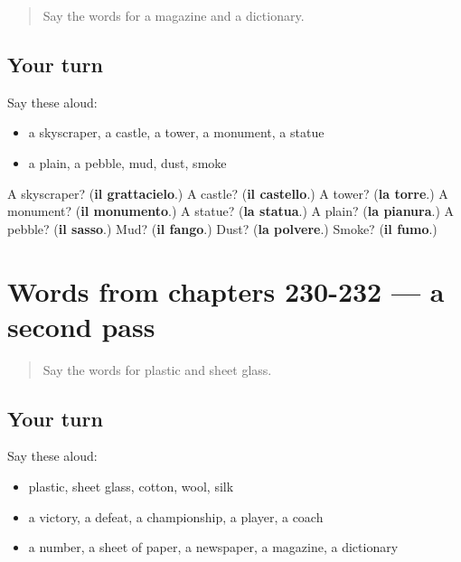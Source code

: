 \label{lesson:IT-R232-first-pass-words-from-chapters-228-229}



\begin{quote}
Say the words for a magazine and a dictionary.
\end{quote}

\subsection*{Your turn}
Say these aloud:

\begin{itemize}
\raggedright
  \item a skyscraper, a castle, a tower, a monument, a statue
  \item a plain, a pebble, mud, dust, smoke
\end{itemize}

\begin{tcolorbox}[breakable,colback=teal!4,colframe=teal!35!black,title={Before you move on}]
A skyscraper? (\textbf{il grattacielo}.) A castle? (\textbf{il castello}.) A tower? (\textbf{la torre}.) A monument? (\textbf{il monumento}.) A statue? (\textbf{la statua}.) A plain? (\textbf{la pianura}.) A pebble? (\textbf{il sasso}.) Mud? (\textbf{il fango}.) Dust? (\textbf{la polvere}.) Smoke? (\textbf{il fumo}.)
\end{tcolorbox}
\section[(dialogue)]{Words from chapters 230-232 — a second pass}

\label{lesson:IT-R232-second-pass-words-from-chapters-230-232}



\begin{quote}
Say the words for plastic and sheet glass.
\end{quote}

\subsection*{Your turn}
Say these aloud:

\begin{itemize}
\raggedright
  \item plastic, sheet glass, cotton, wool, silk
  \item a victory, a defeat, a championship, a player, a coach
  \item a number, a sheet of paper, a newspaper, a magazine, a dictionary
\end{itemize}

